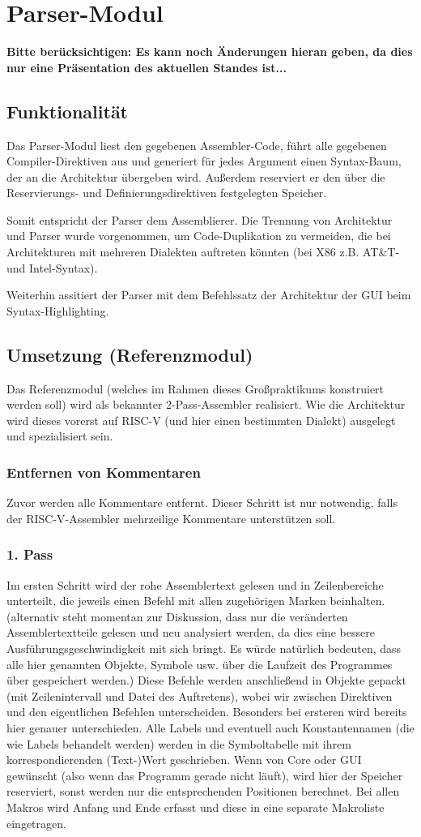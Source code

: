 \section{Parser-Modul}
\textbf{Bitte berücksichtigen: Es kann noch Änderungen hieran geben, da dies nur eine Präsentation des aktuellen Standes ist...}
\subsection{Funktionalität}
Das Parser-Modul liest den gegebenen Assembler-Code,
führt alle gegebenen Compiler-Direktiven aus und generiert für jedes Argument einen Syntax-Baum,
der an die Architektur übergeben wird.
Außerdem reserviert er den über die Reservierungs- und Definierungsdirektiven festgelegten Speicher.

Somit entspricht der Parser dem Assemblierer.
Die Trennung von Architektur und Parser wurde vorgenommen,
um Code-Duplikation zu vermeiden,
die bei Architekturen mit mehreren Dialekten auftreten könnten (bei X86 z.B. AT\&T- und Intel-Syntax).

Weiterhin assitiert der Parser mit dem Befehlssatz der Architektur der GUI beim Syntax-Highlighting.
\subsection{Umsetzung (Referenzmodul)}
Das Referenzmodul (welches im Rahmen dieses Großpraktikums konstruiert werden soll) wird als bekannter 2-Pass-Assembler realisiert. Wie die Architektur wird dieses vorerst auf RISC-V (und hier einen bestimmten Dialekt) ausgelegt und spezialisiert sein.
\subsubsection{Entfernen von Kommentaren}
Zuvor werden alle Kommentare entfernt. Dieser Schritt ist nur notwendig, falls der RISC-V-Assembler mehrzeilige Kommentare unterstützen soll.
\subsubsection{1. Pass}
Im ersten Schritt wird der rohe Assemblertext gelesen und in Zeilenbereiche unterteilt, die jeweils einen Befehl mit allen zugehörigen Marken beinhalten.
(alternativ steht momentan zur Diskussion, dass nur die veränderten Assemblertextteile gelesen und neu analysiert werden, da dies eine bessere Ausführungsgeschwindigkeit mit sich bringt.
Es würde natürlich bedeuten, dass alle hier genannten Objekte, Symbole usw. über die Laufzeit des Programmes über gespeichert werden.)
Diese Befehle werden anschließend in Objekte gepackt (mit Zeilenintervall und Datei des Auftretens), wobei wir zwischen Direktiven und den eigentlichen Befehlen unterscheiden.
Besonders bei ersteren wird bereits hier genauer unterschieden.
Alle Labels und eventuell auch Konstantennamen (die wie Labels behandelt werden) werden in die Symboltabelle mit ihrem korrespondierenden (Text-)Wert geschrieben.
Wenn von Core oder GUI gewünscht (also wenn das Programm gerade nicht läuft), wird hier der Speicher reserviert, sonst werden nur die entsprechenden Positionen berechnet.
Bei allen Makros wird Anfang und Ende erfasst und diese in eine separate Makroliste eingetragen.
